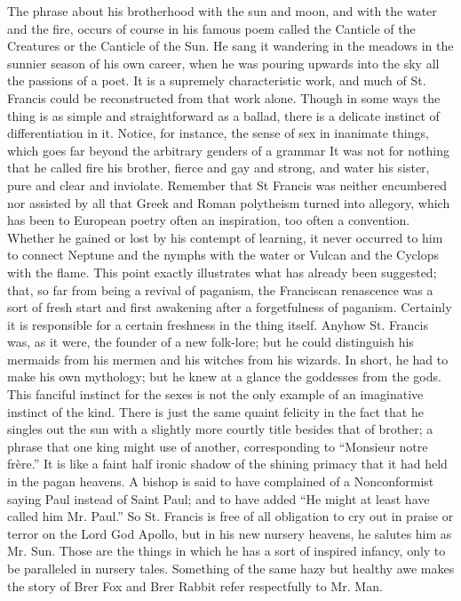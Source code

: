 \documentclass{book}
\begin{document}
The phrase about his brotherhood with the sun and moon, and with the water and the fire, occurs of course in his famous poem called the Canticle of the Creatures or the Canticle of the Sun. He sang it wandering in the meadows in the sunnier season of his own career, when he was pouring upwards into the sky all the passions of a poet. It is a supremely characteristic work, and much of St. Francis could be reconstructed from that work alone. Though in some ways the thing is as simple and straightforward as a ballad, there is a delicate instinct of differentiation in it. Notice, for instance, the sense of sex in inanimate things, which goes far beyond the arbitrary genders of a grammar It was not for nothing that he called fire his brother, fierce and gay and strong, and water his sister, pure and clear and inviolate. Remember that St Francis was neither encumbered nor assisted by all that Greek and Roman polytheism turned into allegory, which has been to European poetry often an inspiration, too often a convention. Whether he gained or lost by his contempt of learning, it never occurred to him to connect Neptune and the nymphs with the water or Vulcan and the Cyclops with the flame. This point exactly illustrates what has already been suggested; that, so far from being a revival of paganism, the Franciscan renascence was a sort of fresh start and first awakening after a forgetfulness of paganism. Certainly it is responsible for a certain freshness in the thing itself. Anyhow St. Francis was, as it were, the founder of a new folk-lore; but he could distinguish his mermaids from his mermen and his witches from his wizards. In short, he had to make his own mythology; but he knew at a glance the goddesses from the gods. This fanciful instinct for the sexes is not the only example of an imaginative instinct of the kind. There is just the same quaint felicity in the fact that he singles out the sun with a slightly more courtly title besides that of brother; a phrase that one king might use of another, corresponding to “Monsieur notre frère.” It is like a faint half ironic shadow of the shining primacy that it had held in the pagan heavens. A bishop is said to have complained of a Nonconformist saying Paul instead of Saint Paul; and to have added “He might at least have called him Mr. Paul.” So St. Francis is free of all obligation to cry out in praise or terror on the Lord God Apollo, but in his new nursery heavens, he salutes him as Mr. Sun. Those are the things in which he has a sort of inspired infancy, only to be paralleled in nursery tales. Something of the same hazy but healthy awe makes the story of Brer Fox and Brer Rabbit refer respectfully to Mr. Man.
\end{document}
